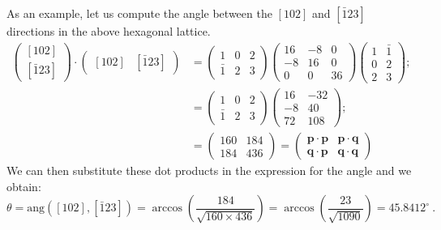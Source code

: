 As an example, let us compute the angle between the $[102]$ and $[\bar{1}23]$ directions in the above hexagonal lattice.  
\begin{equation*}
\begin{split}
\begin{pmatrix}[102]\\ [\bar{1}23]\end{pmatrix}\cdot\begin{pmatrix}[102]&[\bar{1}23]\end{pmatrix} &= 
\begin{pmatrix}1 & 0 & 2\\\bar{1}&2&3\end{pmatrix}\begin{pmatrix}16 & -8& 0 \\ -8 & 16 & 0\\  0 & 0 & 36\end{pmatrix}\begin{pmatrix}1&\bar{1}\\0&2\\ 2&3\end{pmatrix};\\
&= \begin{pmatrix}1 & 0 & 2\\\bar{1}&2&3\end{pmatrix}\begin{pmatrix}16&-32\\-8&40\\ 72&108\end{pmatrix};\\
&= \begin{pmatrix} 160 & 184\\ 184& 436\end{pmatrix} = \begin{pmatrix}\mathbf{p}\cdot\mathbf{p}&\mathbf{p}\cdot\mathbf{q}\\
	\mathbf{q}\cdot\mathbf{p}&\mathbf{q}\cdot\mathbf{q}\end{pmatrix}
\end{split}
\end{equation*}
We can then substitute these dot products in the expression for the angle and we obtain:
\[
	\theta = \text{ang}([102], [\bar{1}23]) = \arccos\left( \frac{184}{\sqrt{160\times 436}}\right)=\arccos\left( \frac{23}{\sqrt{1090}}\right) =  45.8412^{\circ}\ .
\]

